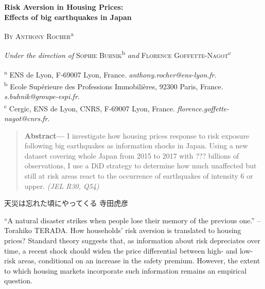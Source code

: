 \documentclass[
  letterpaper,
  DIV=11,
  numbers=noendperiod]{scrartcl}
\author{}
\date{}
\begin{document}
\begin{center}
  \vspace*{0.5cm}

  {\LARGE \textbf{Risk Aversion in Housing Prices: \\ Effects of big earthquakes in Japan}} \\
  \vspace{1.0cm}

  {\large \textsc{By Anthony Rocher}\textsuperscript{a}} \\
  \vspace{0.6cm}
  
  {\small \textit{Under the direction of} \textsc{Sophie Buhnik}\textsuperscript{b} \textit{and} \textsc{Florence Goffette-Nagot}\textsuperscript{c}} \\
  \vspace{1.5cm}

  \textsuperscript{a} \small ENS de Lyon, F-69007 Lyon, France. \textit{anthony.rocher@ens-lyon.fr}.\\
  \textsuperscript{b} \small Ecole Supérieure des Professions Immobilières, 92300 Paris, France. \textit{s.buhnik@groupe-espi.fr}. \\
  \textsuperscript{c} \small Cergic, ENS de Lyon, CNRS, F-69007 Lyon, France. \textit{florence.goffette-nagot@cnrs.fr}.
\end{center}

\vspace{0.8cm}

\begin{quote}
\small
\noindent \textbf{Abstract---} I investigate how housing prices response to risk exposure following big earthquakes as information shocks in Japan. Using a new dataset covering whole Japan from 2015 to 2017 with ??? billions of observations, I use a DiD strategy to determine how much unaffected but still at risk areas react to the occurrence of earthquakes of intensity 6 or upper. \textit{(JEL R30, Q54)}
\end{quote}

天災は忘れた頃にやってくる 寺田虎彦

\vspace{1cm}

\noindent ``A natural disaster strikes when people lose their memory of
the previous one.'' -- Torahiko TERADA. How households' risk aversion is
translated to housing prices? Standard theory suggests that, as
information about risk depreciates over time, a recent shock should
widen the price differential between high- and low-risk areas,
conditional on an increase in the safety premium. However, the extent to
which housing markets incorporate such information remains an empirical
question.
\end{document}
